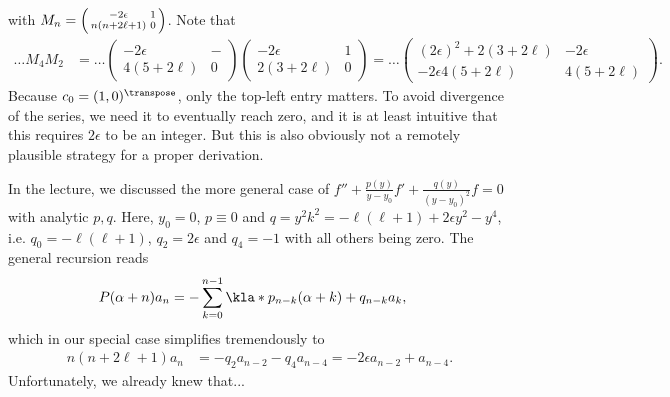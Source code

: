 \documentclass[english, parskip=full]{scrartcl}
\begin{document}
with $M_n = \begin{psmallmatrix} -2\epsilon & 1 \\ n(n+2\ell+1) & 0\end{psmallmatrix}$.
Note that
\begin{align}
\dots M_4M_2 &= \dots \begin{pmatrix}
-2\epsilon & - \\ 4(5+2\ell) & 0
\end{pmatrix} \begin{pmatrix}
-2\epsilon & 1 \\ 2(3+2\ell) & 0
\end{pmatrix} = \dots \begin{pmatrix}
(2\epsilon)^2 + 2(3+2\ell) & -2\epsilon \\ -2\epsilon 4(5+2\ell) & 4(5+2\ell)
\end{pmatrix}.
\end{align}
Because $c_0=(1,0)^\transpose$, only the top-left entry matters.
To avoid divergence of the series, we need it to eventually reach zero, and it is at least intuitive that this requires $2\epsilon$ to be an integer.
But this is also obviously not a remotely plausible strategy for a proper derivation.

In the lecture, we discussed the more general case of $f'' + \frac{p(y)}{y-y_0} f' + \frac{q(y)}{(y-y_0)^2} f = 0$ with analytic $p,q$.
Here, $y_0=0$, $p\equiv 0$ and $q=y^2k^2 = -\ell(\ell+1) + 2\epsilon y^2 - y^4$, i.e. $q_0=-\ell(\ell+1)$, $q_2 = 2\epsilon$ and $q_4=-1$ with all others being zero.
The general recursion reads
\begin{align}
P(\alpha+n) a_n &= - \sum_{k=0}^{n-1} \kla*{p_{n-k} (\alpha+k) + q_{n-k}}a_k,
\end{align}
which in our special case simplifies tremendously to
\begin{align}
n(n+2\ell+1) a_n &= -q_2 a_{n-2} - q_4 a_{n-4} = -2\epsilon a_{n-2} + a_{n-4}.
\end{align}
Unfortunately, we already knew that...
\end{document}
